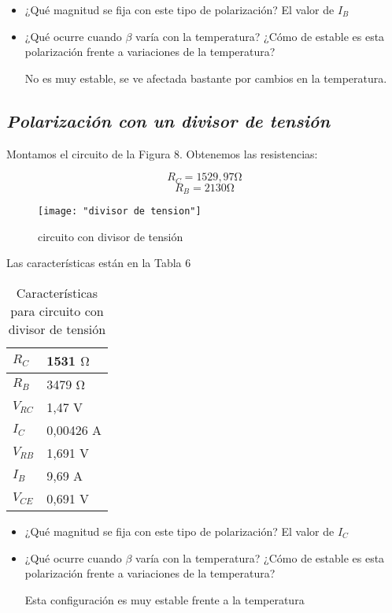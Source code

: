 \documentclass[a4paper,12pt,spanish]{article}
\begin{document}
\begin{itemize}
	
	\item¿Qué magnitud se fija con este tipo de polarización? El valor de $I_B$
	
	
	\item¿Qué ocurre cuando $\beta$ varía con la temperatura? ¿Cómo de estable es esta polarización frente a variaciones de la temperatura?
	
	No es muy estable, se ve afectada bastante por cambios en la temperatura.
			
\end{itemize}



\subsection*{\textit{Polarización con un divisor de tensión}}

Montamos el circuito de la Figura 8. Obtenemos las resistencias:

\[R_C =  1529,97 \si{\ohm} \]
\[R_B =  2130\si{\ohm} \]


\begin{figure}[H]
	\centering
	\texttt{[image: "divisor de tension"]}
	\caption{circuito con divisor de tensión}
	\label{fig:divisor-de-tension}
\end{figure}

Las características están en la Tabla 6

\begin{table}[H]
	\centering
	\begin{tabular}{|l|l|}
		\hline
		$R_C$  & 1531 $\si{\ohm}$   \\ \hline
		$R_B$    & 3479 $\si{\ohm}$   \\ \hline
		$V_{RC}$ & 1,47 V   \\ \hline
		$I_C$    & 0,00426 A\\ \hline
		$V_{RB}$ & 1,691  V \\ \hline
		$I_B$     & 9,69 A   \\ \hline
		$V_{CE}$ & 0,691  V \\ \hline
	\end{tabular}
	\caption{Características para circuito con divisor de tensión}
	\label{tab:my-table}
\end{table}

\begin{itemize}
	
	\item¿Qué magnitud se fija con este tipo de polarización? 
	El valor de $I_C$
	\item¿Qué ocurre cuando $\beta$ varía con la temperatura? ¿Cómo de estable es esta polarización frente a variaciones de la temperatura?
	
	Esta configuración es muy estable frente a la temperatura
	
\end{itemize}
\end{document}

